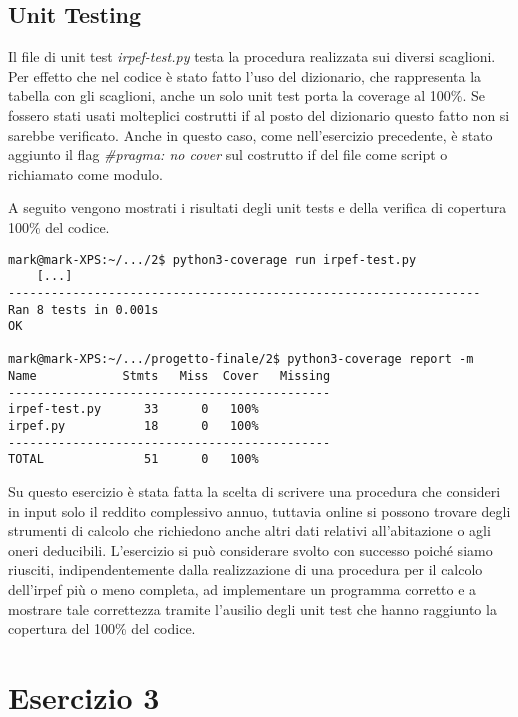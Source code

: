 \documentclass{article}
\newcommand{\pycode}[1]{\textit{#1}}
\newcommand{\filename}[1]{\textit{#1}}
\begin{document}
\subsection{Unit Testing}
Il file di unit test \filename{irpef-test.py} testa la procedura realizzata sui diversi scaglioni. Per effetto che nel codice è stato fatto l'uso del dizionario, che rappresenta la tabella con gli scaglioni, anche un solo unit test porta la coverage al 100\%. Se fossero stati usati molteplici costrutti if al posto del dizionario questo fatto non si sarebbe verificato. 
Anche in questo caso, come nell'esercizio precedente, è stato aggiunto il flag \pycode{\#pragma: no cover} sul costrutto if del file come script o richiamato come modulo.

A seguito vengono mostrati i risultati degli unit tests e della verifica di copertura 100\% del codice.
\begin{verbatim}
mark@mark-XPS:~/.../2$ python3-coverage run irpef-test.py
    [...]
------------------------------------------------------------------
Ran 8 tests in 0.001s
OK

mark@mark-XPS:~/.../progetto-finale/2$ python3-coverage report -m
Name            Stmts   Miss  Cover   Missing
---------------------------------------------
irpef-test.py      33      0   100%
irpef.py           18      0   100%
---------------------------------------------
TOTAL              51      0   100%
\end{verbatim}

Su questo esercizio è stata fatta la scelta di scrivere una procedura che consideri in input solo il reddito complessivo annuo, tuttavia online si possono trovare degli strumenti di calcolo che richiedono anche altri dati relativi all'abitazione o agli oneri deducibili.
L'esercizio si può considerare svolto con successo poiché siamo riusciti, indipendentemente dalla realizzazione di una procedura per il calcolo dell'irpef più o meno completa, ad implementare un programma corretto e a mostrare tale correttezza tramite l'ausilio degli unit test che hanno raggiunto la copertura del 100\% del codice.

\section{Esercizio 3}
\end{document}

